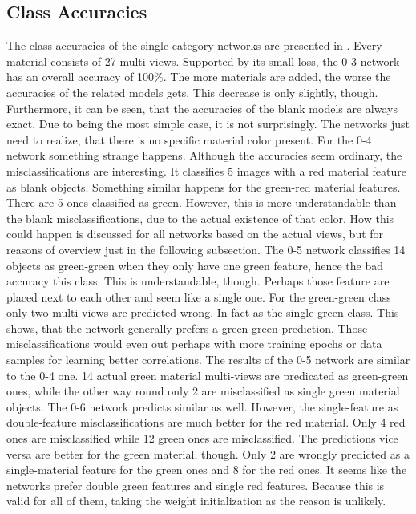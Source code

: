 \subsection{Class Accuracies}
\label{sec:predictions-accuracies}
The class accuracies of the single-category networks are presented in .
Every material consists of 27 multi-views.
Supported by its small loss, the 0-3 network has an overall accuracy of 100\%.
The more materials are added, the worse the accuracies of the related models gets.
This decrease is only slightly, though.
Furthermore, it can be seen, that the accuracies of the blank models are always exact.
Due to being the most simple case, it is not surprisingly.
The networks just need to realize, that there is no specific material color present.
For the 0-4 network something strange happens.
Although the accuracies seem ordinary, the misclassifications are interesting.
It classifies 5 images with a red material feature as blank objects.
Something similar happens for the green-red material features.
There are 5 ones classified as green.
However, this is more understandable than the blank misclassifications, due to the actual existence of that color.
How this could happen is discussed for all networks based on the actual views, but for reasons of overview just in the following subsection.
The 0-5 network classifies 14 objects as green-green when they only have one green feature, hence the bad accuracy this class.
This is understandable, though.
Perhaps those feature are placed next to each other and seem like a single one.
For the green-green class only two multi-views are predicted wrong.
In fact as the single-green class.
This shows, that the network generally prefers a green-green prediction.
Those misclassifications would even out perhaps with more training epochs or data samples for learning better correlations.
The results of the 0-5 network are similar to the 0-4 one.
14 actual green material multi-views are predicated as green-green ones, while the other way round only 2 are misclassified as single green material objects.
The 0-6 network predicts similar as well.
However, the single-feature as double-feature misclassifications are much better for the red material.
Only 4 red ones are misclassified while 12 green ones are misclassified.
The predictions vice versa are better for the green material, though.
Only 2 are wrongly predicted as a single-material feature for the green ones and 8 for the red ones.
It seems like the networks prefer double green features and single red features.
Because this is valid for all of them, taking the weight initialization as the reason is unlikely.
